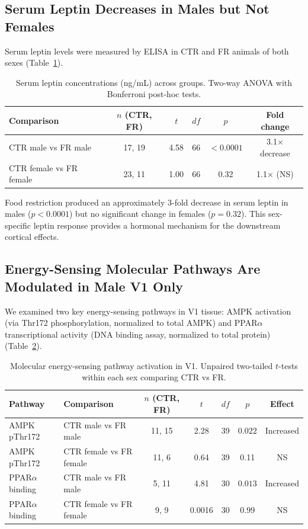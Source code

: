 \documentclass[11pt]{article}
\begin{document}
\subsection{Serum Leptin Decreases in Males but Not Females}

Serum leptin levels were measured by ELISA in CTR and FR animals of both sexes (Table~\ref{tab:leptin}).

\begin{table}[H]
\centering
\caption{Serum leptin concentrations (ng/mL) across groups. Two-way ANOVA with Bonferroni post-hoc tests.}
\label{tab:leptin}
\begin{tabular}{lccccc}
\toprule
Comparison & $n$ (CTR, FR) & $t$ & $df$ & $p$ & Fold change \\
\midrule
CTR male vs FR male & 17, 19 & 4.58 & 66 & $\mathbf{< 0.0001}$ & 3.1$\times$ decrease \\
CTR female vs FR female & 23, 11 & 1.00 & 66 & 0.32 & 1.1$\times$ (NS) \\
\bottomrule
\end{tabular}
\end{table}

Food restriction produced an approximately 3-fold decrease in serum leptin in males ($p < 0.0001$) but no significant change in females ($p = 0.32$). This sex-specific leptin response provides a hormonal mechanism for the downstream cortical effects.

\subsection{Energy-Sensing Molecular Pathways Are Modulated in Male V1 Only}

We examined two key energy-sensing pathways in V1 tissue: AMPK activation (via Thr172 phosphorylation, normalized to total AMPK) and PPAR$\alpha$ transcriptional activity (DNA binding assay, normalized to total protein) (Table~\ref{tab:molecular}).

\begin{table}[H]
\centering
\caption{Molecular energy-sensing pathway activation in V1. Unpaired two-tailed $t$-tests within each sex comparing CTR vs FR.}
\label{tab:molecular}
\begin{tabular}{llccccc}
\toprule
Pathway & Comparison & $n$ (CTR, FR) & $t$ & $df$ & $p$ & Effect \\
\midrule
AMPK pThr172 & CTR male vs FR male & 11, 15 & 2.28 & 39 & $\mathbf{0.022}$ & Increased \\
AMPK pThr172 & CTR female vs FR female & 11, 6 & 0.64 & 39 & 0.11 & NS \\
PPAR$\alpha$ binding & CTR male vs FR male & 5, 11 & 4.81 & 30 & $\mathbf{0.013}$ & Increased \\
PPAR$\alpha$ binding & CTR female vs FR female & 9, 9 & 0.0016 & 30 & 0.99 & NS \\
\bottomrule
\end{tabular}
\end{table}
\end{document}
